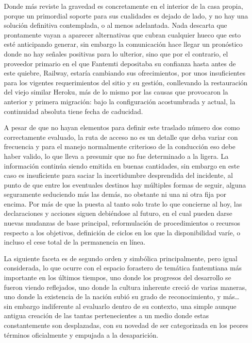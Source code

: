 \documentclass[
]{book}
\begin{document}
Donde más reviste la gravedad es concretamente en el interior de la casa propia, porque un primordial soporte para sus cualidades es dejado de lado, y no hay una solución definitiva contemplada, o al menos adelantada. Nada descarta que prontamente vayan a aparecer alternativas que cubran cualquier hueco que esto esté anticipando generar, sin embargo la comunicación hace llegar un pronóstico donde no hay señales positivas para lo ulterior, sino que por el contrario, el proveedor primario en el que Fantemti depositaba su confianza hasta antes de este quiebre, Railway, estaría cambiando sus ofrecimientos, por unos insuficientes para los vigentes requerimientos del sitio y su gestión, conllevando la restauración del viejo similar Heroku, más de lo mismo por las causas que provocaron la anterior y primera migración: bajo la configuración acostumbrada y actual, la continuidad absoluta tiene fecha de caducidad.

A pesar de que no hayan elementos para definir este traslado número dos como correctamente evaluado, la ruta de acceso no es un detalle que deba variar con frecuencia y para el manejo normalmente criterioso de la conducción eso debe haber valido, lo que lleva a presumir que no fue determinado a la ligera. La información continúa siendo emitida en buenas cantidades, sin embargo en este caso es insuficiente para saciar la incertidumbre desprendida del incidente, al punto de que entre los eventuales destinos hay múltiples formas de seguir, alguna seguramente seduciendo más las demás, no obstante ni una ni otra fija por encima. Por más de que la puesta al tanto solo trate lo que concierne al hoy, las declaraciones y acciones siguen debiéndose al futuro, en el cual pueden darse nuevas mudanzas de base principal, reformulación de procedimientos o recursos respecto a los objetivos, definición de ciclos en los que la disponibilidad varíe, o incluso el cese total de la permanencia en línea.

La siguiente faceta es de segundo orden y simbólica principalmente, pero igual considerada, lo que ocurre con el espacio forastero de temática fantemtiana más importante en los últimos tiempos, uno donde los progresos del desarrollo se fueron viendo reflejados, uno donde la cultura inherente creció de varias maneras, uno donde la existencia de la nación subió su grado de reconocimiento, y más\ldots{} sin embargo indiferente al evaluarlo dentro de su contexto, una simple aunque antigua creación de las tantas pertenecientes a un medio donde estas constantemente son desplazadas, con su novedad de ser categorizada en los peores términos oficialmente y empujada a la desaparición.
\end{document}
